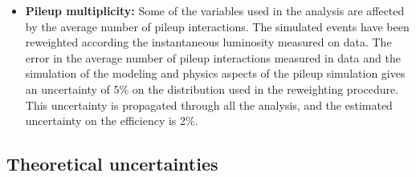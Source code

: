 \begin{itemize}
\item {\bf Pileup multiplicity:} Some of the variables used in the
  analysis are affected by the average number of pileup
  interactions. The simulated events have been reweighted according
  the instantaneous luminosity measured on data.
  The error in the average number of pileup interactions measured in data
  and the simulation of the modeling and physics aspects of the pileup simulation 
  gives an uncertainty of 5\% on the 
  distribution used in the reweighting procedure.
  This uncertainty is propagated through all
  the analysis, and the estimated uncertainty on the efficiency is 2\%.

\end{itemize}

\subsection{Theoretical uncertainties \label{subsec:thsyst}}

